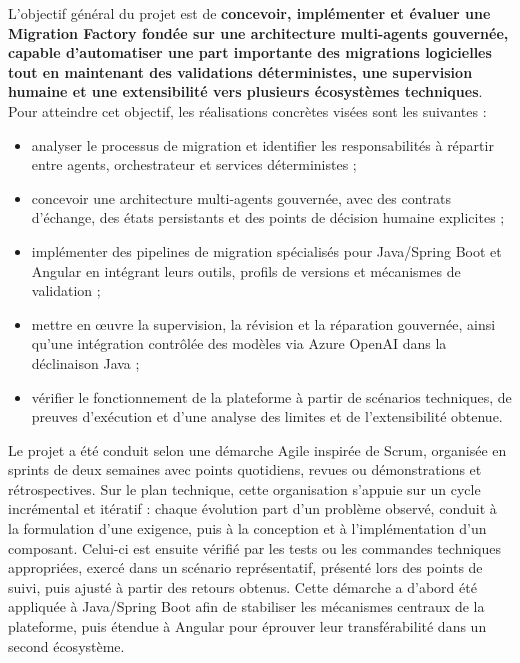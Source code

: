 L'objectif général du projet est de \textbf{concevoir, implémenter et évaluer une Migration Factory fondée sur une architecture multi-agents gouvernée, capable d'automatiser une part importante des migrations logicielles tout en maintenant des validations déterministes, une supervision humaine et une extensibilité vers plusieurs écosystèmes techniques}. Pour atteindre cet objectif, les réalisations concrètes visées sont les suivantes :

\begin{itemize}
    \item analyser le processus de migration et identifier les responsabilités à répartir entre agents, orchestrateur et services déterministes ;
    \item concevoir une architecture multi-agents gouvernée, avec des contrats d'échange, des états persistants et des points de décision humaine explicites ;
    \item implémenter des pipelines de migration spécialisés pour Java/Spring Boot et Angular en intégrant leurs outils, profils de versions et mécanismes de validation ;
    \item mettre en œuvre la supervision, la révision et la réparation gouvernée, ainsi qu'une intégration contrôlée des modèles via Azure OpenAI dans la déclinaison Java ;
    \item vérifier le fonctionnement de la plateforme à partir de scénarios techniques, de preuves d'exécution et d'une analyse des limites et de l'extensibilité obtenue.
\end{itemize}

Le projet a été conduit selon une démarche Agile inspirée de Scrum, organisée en sprints de deux semaines avec points quotidiens, revues ou démonstrations et rétrospectives. Sur le plan technique, cette organisation s'appuie sur un cycle incrémental et itératif : chaque évolution part d'un problème observé, conduit à la formulation d'une exigence, puis à la conception et à l'implémentation d'un composant. Celui-ci est ensuite vérifié par les tests ou les commandes techniques appropriées, exercé dans un scénario représentatif, présenté lors des points de suivi, puis ajusté à partir des retours obtenus. Cette démarche a d'abord été appliquée à Java/Spring Boot afin de stabiliser les mécanismes centraux de la plateforme, puis étendue à Angular pour éprouver leur transférabilité dans un second écosystème.

